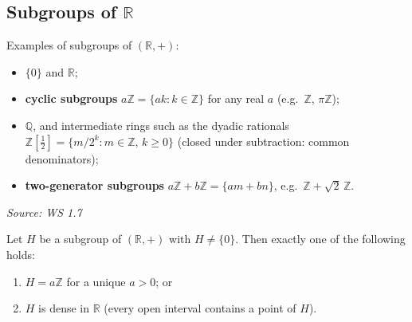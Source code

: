 \documentclass[11pt]{report}
\newcommand{\srcline}[1]{\par\hfill{\footnotesize\textit{Source: #1}}}
\begin{document}
\subsection{\texorpdfstring{Subgroups of $\mathbb{R}$}{Subgroups of ℝ}}

\begin{exbox}\label{ex:subgroups-r-list}
Examples of subgroups of $(\mathbb{R}, +)$:
\begin{itemize}[nosep]
    \item $\{0\}$ and $\mathbb{R}$;
    \item \textbf{cyclic subgroups} $a\mathbb{Z} = \{ak : k \in \mathbb{Z}\}$ for any real $a$ (e.g.\ $\mathbb{Z}$, $\pi\mathbb{Z}$);
    \item $\mathbb{Q}$, and intermediate rings such as the dyadic rationals $\mathbb{Z}[\tfrac12] = \{m/2^k : m \in \mathbb{Z},\, k \geq 0\}$ (closed under subtraction: common denominators);
    \item \textbf{two-generator subgroups} $a\mathbb{Z} + b\mathbb{Z} = \{am + bn\}$, e.g.\ $\mathbb{Z} + \sqrt{2}\,\mathbb{Z}$.
\end{itemize}
\srcline{WS 1.7}
\end{exbox}

\begin{propbox}\label{prop:dichotomy-subgroups-r}
Let $H$ be a subgroup of $(\mathbb{R}, +)$ with $H \neq \{0\}$. Then exactly one of the following holds:
\begin{enumerate}
    \item $H = a\mathbb{Z}$ for a unique $a > 0$; or
    \item $H$ is dense in $\mathbb{R}$ (every open interval contains a point of $H$).
\end{enumerate}
\end{propbox}
\end{document}
